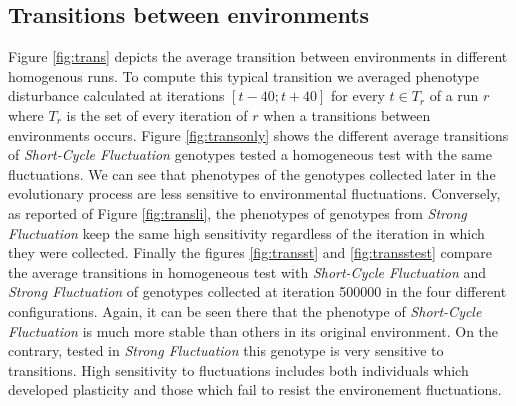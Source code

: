 \subsection{Transitions between environments} 
Figure \ref{fig:trans} depicts the average transition between environments in different homogenous runs. To compute this typical transition we averaged phenotype disturbance calculated at iterations $[t-40; t + 40]$ for every $t \in T_r$ of a run $r$ where $T_r$ is the set of every iteration of $r$ when a transitions between environments occurs. Figure  \ref{fig:transonly} shows the different average transitions of \emph{Short-Cycle Fluctuation} genotypes tested a homogeneous test with the same fluctuations. We can see that phenotypes of the genotypes collected later in the evolutionary process are less sensitive to environmental fluctuations. Conversely, as reported of Figure \ref{fig:transli}, the phenotypes of genotypes from \emph{Strong Fluctuation} keep the same high sensitivity regardless of the iteration in which they were collected. Finally the figures \ref{fig:transst} and \ref{fig:transstest} compare the average transitions in homogeneous test with \emph{Short-Cycle Fluctuation} and \emph{Strong Fluctuation} of genotypes collected at iteration 500000 in the four different configurations. Again, it can be seen there that the phenotype of \emph{Short-Cycle Fluctuation} is much more stable than others in its original environment. On the contrary, tested in \emph{Strong Fluctuation} this genotype is very sensitive to transitions. High sensitivity to fluctuations includes both individuals which developed plasticity and those which fail to resist the environement fluctuations.


